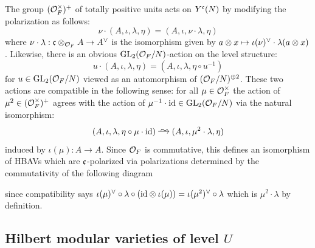 \documentclass[main.tex]{subfiles}
\begin{document}
The group $(\mathcal{O}_F^\times)^+$ of totally positive units acts on $Y^{\mathfrak{c}}(N)$ by modifying the polarization as follows:
\[ \nu \cdot (A, \iota, \lambda, \eta) = (A, \iota, \nu \cdot \lambda, \eta) \]
where $\nu \cdot \lambda : \mathfrak{c} \otimes_{\mathcal{O}_F} A \to A^{\vee}$ is the isomorphism given by $a \otimes x \mapsto \iota(\nu)^{\vee} \cdot \lambda(a \otimes x)$. Likewise, there is an obvious $\mathrm{GL}_2(\mathcal{O}_F/N)$-action on the level structure:
\[ u \cdot (A, \iota, \lambda, \eta) = (A, \iota, \lambda, \eta \circ u^{-1}) \]
for $u \in \mathrm{GL}_2(\mathcal{O}_F/N)$ viewed as an automorphism of $(\mathcal{O}_F/N)^{\oplus 2}$. These two actions are compatible in the following sense: for all $\mu \in \mathcal{O}_F^{\times}$ the action of $\mu^2 \in (\mathcal{O}_F^\times)^+$ agrees with the action of $\mu^{-1} \cdot \mathrm{id} \in \mathrm{GL}_2(\mathcal{O}_F/N)$ via the natural isomorphism:
\begin{equation} \label{eq:isom_trivial_action_subgroup}
(A, \iota, \lambda, \eta \circ \mu \cdot \id) \iso (A, \iota, \mu^2 \cdot \lambda, \eta)
\end{equation}
induced by $\iota(\mu) : A \to A$. Since $\mathcal{O}_F$ is commutative, this defines an isomorphism of HBAVs which are $\mathfrak{c}$-polarized via polarizations determined by the commutativity of the following diagram
\begin{center}
\end{center}
since compatibility says $\iota(\mu)^{\vee} \circ \lambda \circ (\mathrm{id} \otimes \iota(\mu)) = \iota(\mu^2)^{\vee} \circ \lambda$ which is $\mu^2 \cdot \lambda$ by definition.

\subsection{Hilbert modular varieties of level $U$}
\end{document}
